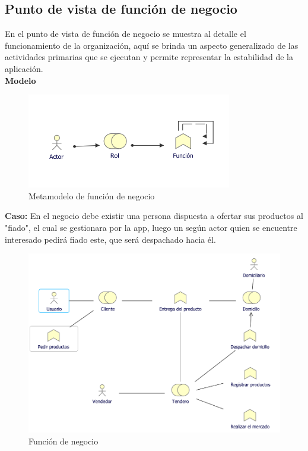 	\subsection{Punto de vista de función de negocio}
	{ En el punto de vista de función de negocio se muestra al detalle el funcionamiento de la organización, aquí se brinda un aspecto generalizado de las actividades primarias que se ejecutan y permite representar la estabilidad de la aplicación.\\
		
		\textbf{Modelo}\\
		\begin{figure}[H]
			\centering
			\includegraphics[width=0.8\linewidth]{development/funcion.png}
			\caption{Metamodelo de función de negocio}
		\end{figure}
		
		\textbf{Caso:} En el negocio debe existir una persona dispuesta a ofertar sus productos al "fiado", el cual se gestionara por la app, luego un según actor quien se encuentre interesado pedirá fiado este, que será despachado hacia él.
		
		\begin{figure}[H]
			\centering
			\includegraphics[width=0.8\linewidth]{development/funcion.pdf}
			\caption{Función de negocio}
		\end{figure}
	}
	

